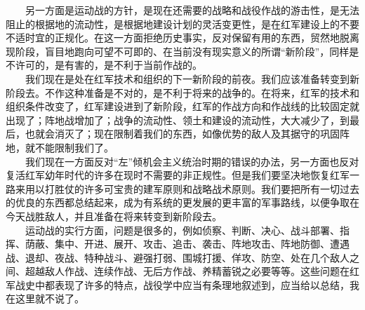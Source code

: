 \documentclass[cn,11pt,chinese]{elegantbook}
\begin{document}
　　另一方面是运动战的方针，是现在还需要的战略和战役作战的游击性，是无法阻止的根据地的流动性，是根据地建设计划的灵活变更性，是在红军建设上的不要不适时宜的正规化。在这一方面拒绝历史事实，反对保留有用的东西，贸然地脱离现阶段，盲目地跑向可望不可即的、在当前没有现实意义的所谓“新阶段”，同样是不许可的，是有害的，是不利于当前作战的。\\
　　我们现在是处在红军技术和组织的下一新阶段的前夜。我们应该准备转变到新阶段去。不作这种准备是不对的，是不利于将来的战争的。在将来，红军的技术和组织条件改变了，红军建设进到了新阶段，红军的作战方向和作战线的比较固定就出现了；阵地战增加了；战争的流动性、领土和建设的流动性，大大减少了，到最后，也就会消灭了；现在限制着我们的东西，如像优势的敌人及其据守的巩固阵地，就不能限制我们了。\\
　　我们现在一方面反对“左”倾机会主义统治时期的错误的办法，另一方面也反对复活红军幼年时代的许多在现时不需要的非正规性。但是我们要坚决地恢复红军一路来用以打胜仗的许多可宝贵的建军原则和战略战术原则。我们要把所有一切过去的优良的东西都总结起来，成为有系统的更发展的更丰富的军事路线，以便争取在今天战胜敌人，并且准备在将来转变到新阶段去。\\
　　运动战的实行方面，问题是很多的，例如侦察、判断、决心、战斗部署、指挥、荫蔽、集中、开进、展开、攻击、追击、袭击、阵地攻击、阵地防御、遭遇战、退却、夜战、特种战斗、避强打弱、围城打援、佯攻、防空、处在几个敌人之间、超越敌人作战、连续作战、无后方作战、养精蓄锐之必要等等。这些问题在红军战史中都表现了许多的特点，战役学中应当有条理地叙述到，应当给以总结，我在这里就不说了。\\
\end{document}
